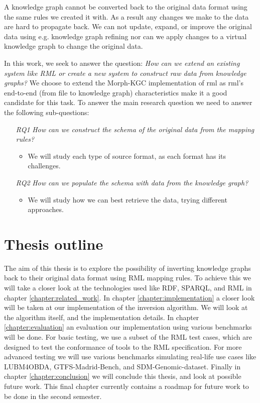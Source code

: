 A knowledge graph cannot be converted back to the original data format using the same rules we created it with. As a result any changes we make to the data are hard to propagate back. We can not update, expand, or improve the original data using e.g. knowledge graph refining nor can we apply changes to a virtual knowledge graph to change the original data. 

In this work, we seek to answer the question: \textit{How can we extend an existing system like RML or create a new system to construct raw data from knowledge graphs?} We choose to extend the Morph-KGC implementation \citep{arenas2022morph} of \acrshort{rml} \citep{dimou_ldow_2014} as \acrshort{rml}'s end-to-end (from file to knowledge graph) characteristics make it a good candidate for this task. To answer the main research question we need to answer the following sub-questions:
\begin{itemize}
    \item[\textit{RQ1}] \textit{How can we construct the schema of the original data from the mapping rules?}
    \begin{itemize}
        \item We will study each type of source format, as each format has its challenges.
    \end{itemize}
    \item[\textit{RQ2}] \textit{How can we populate the schema with data from the knowledge graph?}
    \begin{itemize}
        \item We will study how we can best retrieve the data, trying different approaches.
    \end{itemize}
\end{itemize}

\section{Thesis outline}
The aim of this thesis is to explore the possibility of inverting knowledge graphs back to their original data format using RML mapping rules. To achieve this we will take a closer look at the technologies used like RDF, SPARQL, and RML in chapter \ref{chapter:related_work}. %
In chapter \ref{chapter:implementation} a closer look will be taken at our implementation of the inversion algorithm. We will look at the algorithm itself, and the implementation details. 
In chapter \ref{chapter:evaluation} an evaluation our implementation using various benchmarks will be done. For basic testing, we use a subset of the RML test cases, which are designed to test the conformance of tools to the RML specification. For more advanced testing we will use various benchmarks simulating real-life use cases like LUBM4OBDA, GTFS-Madrid-Bench, and SDM-Genomic-dataset. Finally in chapter \ref{chapter:conclusion} we will conclude this thesis, and look at possible future work. This final chapter currently contains a roadmap for future work to be done in the second semester.
